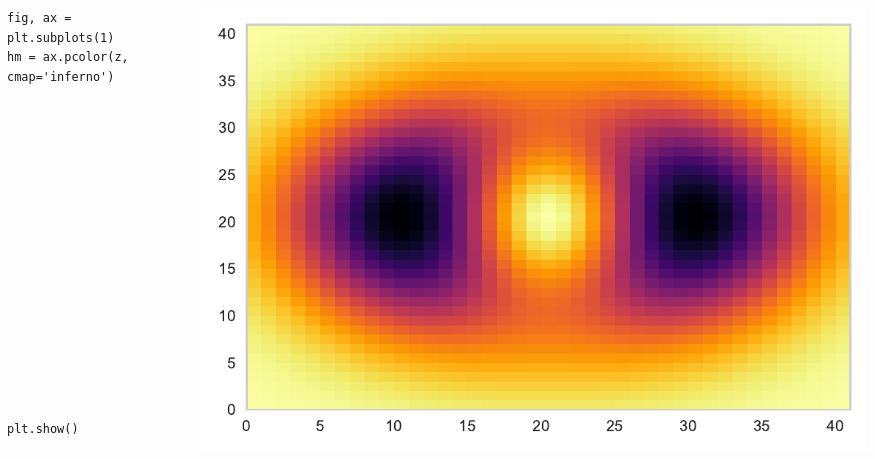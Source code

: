 \documentclass{beamer}
\begin{document}
\begin{frame}[fragile]
\tiny{
\begin{columns}
\begin{column}{0.45\textwidth}
\begin{verbatim}
fig, ax = plt.subplots(1)
hm = ax.pcolor(z, cmap='inferno')

















plt.show()
\end{verbatim}
\end{column}
\begin{column}{0.55\textwidth}
\includegraphics[width=\textwidth]{../heatmap_2.pdf}
\end{column}
\end{columns}
}
\end{frame}
\end{document}
